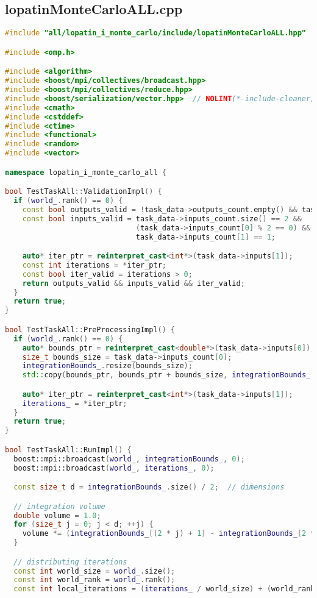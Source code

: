 \documentclass[12pt,a4paper]{extarticle}
\begin{document}
\subsection{lopatinMonteCarloALL.cpp}
\begin{lstlisting}[language=C++]
#include "all/lopatin_i_monte_carlo/include/lopatinMonteCarloALL.hpp"

#include <omp.h>

#include <algorithm>
#include <boost/mpi/collectives/broadcast.hpp>
#include <boost/mpi/collectives/reduce.hpp>
#include <boost/serialization/vector.hpp>  // NOLINT(*-include-cleaner)
#include <cmath>
#include <cstddef>
#include <ctime>
#include <functional>
#include <random>
#include <vector>

namespace lopatin_i_monte_carlo_all {

bool TestTaskAll::ValidationImpl() {
  if (world_.rank() == 0) {
    const bool outputs_valid = !task_data->outputs_count.empty() && task_data->outputs_count[0] == 1;
    const bool inputs_valid = task_data->inputs_count.size() == 2 &&
                              (task_data->inputs_count[0] % 2 == 0) &&  // odd num of bounds
                              task_data->inputs_count[1] == 1;          // iterations num

    auto* iter_ptr = reinterpret_cast<int*>(task_data->inputs[1]);
    const int iterations = *iter_ptr;
    const bool iter_valid = iterations > 0;
    return outputs_valid && inputs_valid && iter_valid;
  }
  return true;
}

bool TestTaskAll::PreProcessingImpl() {
  if (world_.rank() == 0) {
    auto* bounds_ptr = reinterpret_cast<double*>(task_data->inputs[0]);
    size_t bounds_size = task_data->inputs_count[0];
    integrationBounds_.resize(bounds_size);
    std::copy(bounds_ptr, bounds_ptr + bounds_size, integrationBounds_.begin());

    auto* iter_ptr = reinterpret_cast<int*>(task_data->inputs[1]);
    iterations_ = *iter_ptr;
  }
  return true;
}

bool TestTaskAll::RunImpl() {
  boost::mpi::broadcast(world_, integrationBounds_, 0);
  boost::mpi::broadcast(world_, iterations_, 0);

  const size_t d = integrationBounds_.size() / 2;  // dimensions

  // integration volume
  double volume = 1.0;
  for (size_t j = 0; j < d; ++j) {
    volume *= (integrationBounds_[(2 * j) + 1] - integrationBounds_[2 * j]);
  }

  // distributing iterations
  const int world_size = world_.size();
  const int world_rank = world_.rank();
  const int local_iterations = (iterations_ / world_size) + (world_rank < (iterations_ % world_size) ? 1 : 0);


\end{lstlisting}
\end{document}
